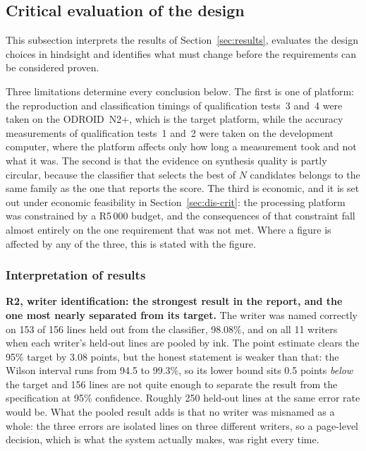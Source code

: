 \label{sec:discussion}

\subsection{Critical evaluation of the design} %

This subsection interprets the results of Section~\ref{sec:results}, evaluates the design choices in hindsight and identifies what must change before the requirements can be considered proven.
\label{sec:dis-critical}

Three limitations determine every conclusion below.
The first is one of platform: the reproduction and classification timings of qualification tests~3 and~4 were taken on the ODROID~N2+, which is the target platform, while the accuracy measurements of qualification tests~1 and~2 were taken on the development computer, where the platform affects only how long a measurement took and not what it was.
The second is that the evidence on synthesis quality is partly circular, because the classifier that selects the best of $N$ candidates belongs to the same family as the one that reports the score.
The third is economic, and it is set out under economic feasibility in Section~\ref{sec:dis-crit}: the processing platform was constrained by a \mbox{R5\,000} budget, and the consequences of that constraint fall almost entirely on the one requirement that was not met.
Where a figure is affected by any of the three, this is stated with the figure.

    \subsubsection{Interpretation of results}
    \label{sec:dis-interp}

        \textbf{R2, writer identification: the strongest result in the report, and the one most nearly separated from its target.}
        The writer was named correctly on 153 of 156 lines held out from the classifier, 98.08\%, and on all 11 writers when each writer's held-out lines are pooled by ink.
        The point estimate clears the 95\% target by 3.08 points, but the honest statement is weaker than that: the Wilson interval runs from 94.5 to 99.3\%, so its lower bound sits 0.5 points \emph{below} the target and 156 lines are not quite enough to separate the result from the specification at 95\% confidence.
        Roughly 250 held-out lines at the same error rate would be.
        What the pooled result adds is that no writer was misnamed as a whole: the three errors are isolated lines on three different writers, so a page-level decision, which is what the system actually makes, was right every time.

